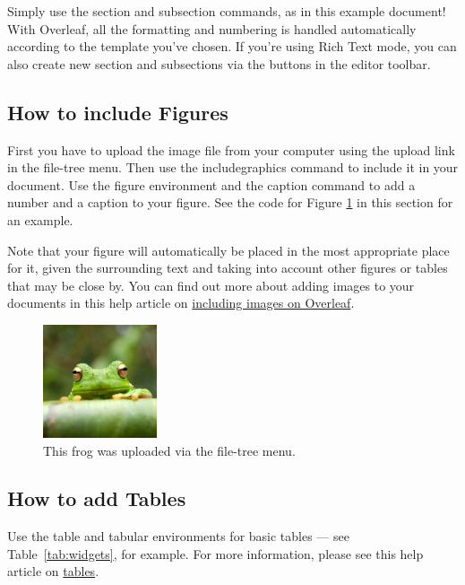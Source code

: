 \documentclass[twoside, 12pt, english,italian,latin,greek,french,spanish,brazil]{book}
\begin{document}
        Simply use the section and subsection commands, as in this example document! With Overleaf, all the formatting and numbering is handled automatically according to the template you've chosen. If you're using Rich Text mode, you can also create new section and subsections via the buttons in the editor toolbar.

    \subsection{How to include Figures}

        First you have to upload the image file from your computer using the upload link in the file-tree menu. Then use the includegraphics command to include it in your document. Use the figure environment and the caption command to add a number and a caption to your figure. See the code for Figure \ref{fig:frog} in this section for an example.

Note that your figure will automatically be placed in the most appropriate place for it, given the surrounding text and taking into account other figures or tables that may be close by. You can find out more about adding images to your documents in this help article on \href{https://www.overleaf.com/learn/how-to/Including_images_on_Overleaf}{including images on Overleaf}.

\begin{figure}
\centering
\includegraphics[width=0.3\textwidth]{Images/frog.jpg}
\caption{\label{fig:frog}This frog was uploaded via the file-tree menu.}
\end{figure}

\subsection{How to add Tables}

Use the table and tabular environments for basic tables --- see Table~\ref{tab:widgets}, for example. For more information, please see this help article on \href{https://www.overleaf.com/learn/latex/tables}{tables}. 
\end{document}

